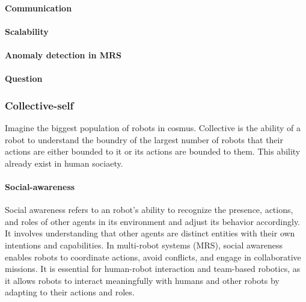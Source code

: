 \documentclass{book}
\begin{document}
\paragraph{Communication}


\paragraph{Scalability}


\paragraph{Anomaly detection in MRS}


\paragraph{Question}


\subsubsection{Collective-self}
Imagine the biggest population of robots in cosmus. Collective is the ability of a robot to understand the boundry of the largest number of robots that their actions are either bounded to it or its actions are bounded to them. This ability already exist in human sociaety.


\paragraph{Social-awareness}
Social awareness refers to an robot's ability to recognize the presence, actions, and roles of other agents in its environment and adjust its behavior accordingly. It involves understanding that other agents are distinct entities with their own intentions and capabilities. In multi-robot systems (MRS), social awareness enables robots to coordinate actions, avoid conflicts, and engage in collaborative missions. It is essential for human-robot interaction and team-based robotics, as it allows robots to interact meaningfully with humans and other robots by adapting to their actions and roles.
\end{document}
